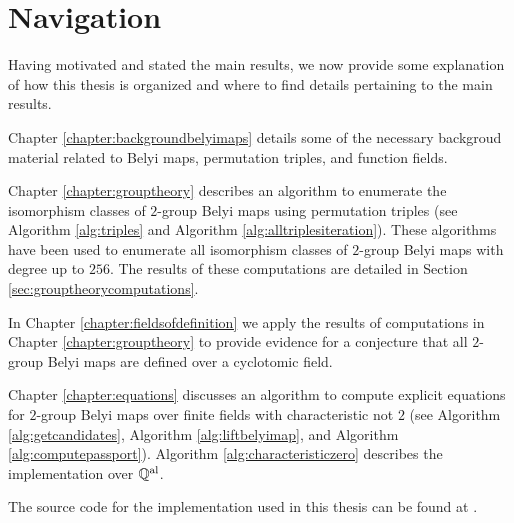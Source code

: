 \documentclass{dcthesis}
\newcommand{\QQal}{{\mathbb Q}^{\textup{al}}}
\numberwithin{equation}{section}
\theoremstyle{definition}
\theoremstyle{remark}
\begin{document}
{{  \section{Navigation}{\label{sec:navigation}
    Having motivated and stated the main
    results, we now provide
    some explanation of how this thesis is
    organized
    and where to find details pertaining
    to the main results.
    \par
    Chapter \ref{chapter:backgroundbelyimaps}
    details some of the
    necessary backgroud material
    related to Belyi maps,
    permutation triples,
    and function fields.
    \par
    Chapter \ref{chapter:grouptheory}
    describes an algorithm
    to enumerate the
    isomorphism classes
    of $2$-group Belyi maps
    using permutation triples
    (see
    Algorithm \ref{alg:triples}
    and
    Algorithm \ref{alg:alltriplesiteration}).
    These algorithms have been used to
    enumerate all isomorphism classes of
    $2$-group Belyi maps with degree
    up to $256$.
    The results of these computations are
    detailed in
    Section \ref{sec:grouptheorycomputations}.
    \par
    In Chapter \ref{chapter:fieldsofdefinition}
    we apply the results of
    computations in
    Chapter \ref{chapter:grouptheory}
    to provide evidence for a conjecture
    that all
    $2$-group Belyi maps
    are defined over a cyclotomic field.
    \par
    Chapter \ref{chapter:equations}
    discusses an algorithm to
    compute explicit equations
    for $2$-group Belyi maps
    over finite fields with
    characteristic not $2$
    (see
    Algorithm \ref{alg:getcandidates},
    Algorithm \ref{alg:liftbelyimap},
    and
    Algorithm \ref{alg:computepassport}).
    Algorithm \ref{alg:characteristiczero}
    describes the implementation over
    $\QQal$.
    \par
    The source code for the implementation used
    in this thesis can be found at
    \cite{twogroupdessins}.
  }
}}
\end{document}
